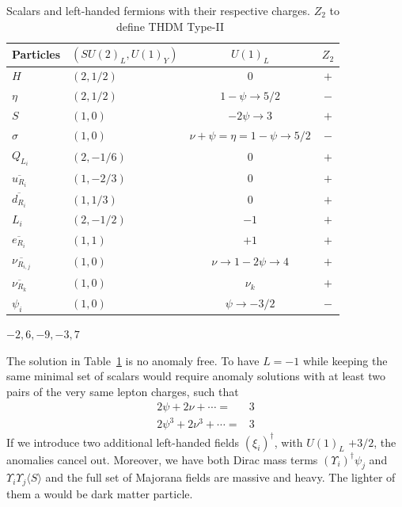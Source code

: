 \documentclass[12pt]{article}
\begin{document}
%
\begin{table}
  \centering
  \begin{tabular}{|l|l|c|c|}
    \hline  
    Particles     & $\left( SU(2)_L, U(1)_Y \right)$ & $U(1)_{L}$& $Z_2$\\ \hline
    $H $  & $(2, 1/2)$ &  0 &$+$\\
    $\eta$ & $(2,1/2)$ & $1-\psi\to 5/2$ &$-$\\
    $S$ & $(1,0)$ & $-2\psi\to 3$ &$+$\\
    $\sigma$ & $(1,0)$ & $\nu+\psi=\eta=1-\psi\to 5/2$&$-$\\
    \hline
    $Q_{L_{i}}$  & $(2,-1/6)$ & $0$& $+$\\
    $\overline{u_{R_{i}}}$ & $(1,-2/3)$ & $0$& $+$\\
    $\overline{d_{R_{i}}}$ & $(1,1/3)$ & $0$& $+$\\
    \hline
    $L_i$  & $(2,-1/2)$ & $-1$& $+$\\
    $\overline{e_{R_i}}$ & $(1,1)$ & $+1$ & $+$ \\
    $\overline{\nu_{R_{i,j}}}$ & $(1,0)$ & $\nu\to 1-2\psi\to 4$&$+$\\
    $\overline{\nu_{R_k}}$ & $(1,0)$ & $\nu_k$&$+$\\
    $\psi_{i}$  & $(1,0)$ & $\psi\to -3/2$ &$-$\\\hline
  \end{tabular}
  \caption{Scalars and left-handed fermions with their respective charges. $Z_2$ to define THDM Type-II~\cite{1303.0168}}
  \label{tab:partcont}
\end{table}
%

$-2,6,-9,-3,7$

The solution in Table~\ref{tab:partcont} is no anomaly free. To have $L=-1$ while keeping the same minimal set of scalars would require anomaly solutions with at least two pairs of the very same lepton charges, such that
\begin{align}
    2\psi+2\nu+\cdots=&3 \nonumber\\
    2\psi^3+2\nu^3+\cdots=&3
\end{align}
If we introduce two additional left-handed fields $(\xi_i)^\dagger$,  with $U(1)_L$ $+3/2$, the anomalies cancel out. Moreover, we have both Dirac mass terms $(\Upsilon_i)^\dagger\psi_j$ and $ \Upsilon_i \Upsilon_j \langle S\rangle$ and the full set of Majorana fields are massive and heavy. The lighter of them a would be dark matter particle.
\end{document}
